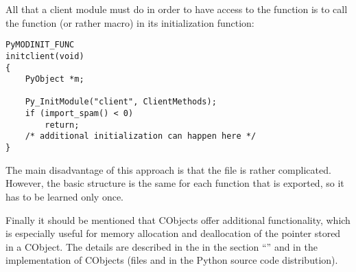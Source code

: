 All that a client module must do in order to have access to the
function  is to call the function (or
rather macro)  in its initialization
function:

\begin{verbatim}
PyMODINIT_FUNC
initclient(void)
{
    PyObject *m;

    Py_InitModule("client", ClientMethods);
    if (import_spam() < 0)
        return;
    /* additional initialization can happen here */
}
\end{verbatim}

The main disadvantage of this approach is that the file
 is rather complicated. However, the
basic structure is the same for each function that is
exported, so it has to be learned only once.

Finally it should be mentioned that CObjects offer additional
functionality, which is especially useful for memory allocation and
deallocation of the pointer stored in a CObject. The details
are described in the  in the section
``'' and in the implementation
of CObjects (files  and
 in the Python source code distribution).
